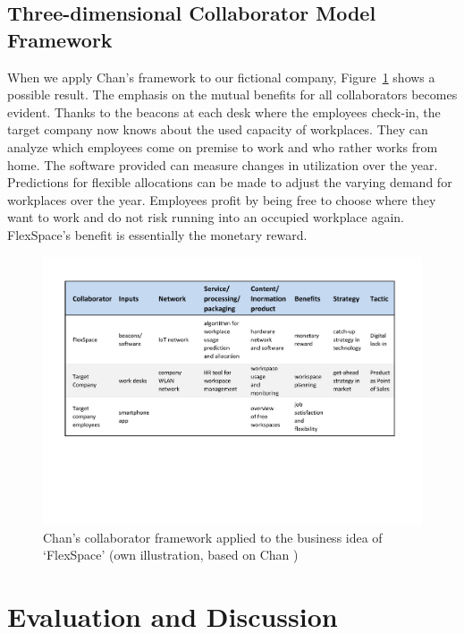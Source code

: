 	\subsection{Three-dimensional Collaborator Model Framework}
		When we apply Chan's framework to our fictional company, Figure~\ref{fig:use_case_chan} shows a possible result. The emphasis on the mutual benefits for all collaborators becomes evident. Thanks to the beacons at each desk where the employees check-in, the target company now knows about the used capacity of workplaces. They can analyze which employees come on premise to work and who rather works from home. The software provided can measure changes in utilization over the year. Predictions for flexible allocations can be made to adjust the varying demand for workplaces over the year. Employees profit by being free to choose where they want to work and do not risk running into an occupied workplace again. FlexSpace's benefit is essentially the monetary reward.

		\begin{figure}[ht]
		    \begin{center}
		    \includegraphics[scale=0.6]{Talk11/use_case_chan.pdf}
		    \end{center}
		    \caption{Chan's collaborator framework applied to the business idea of `FlexSpace' (own illustration, based on Chan \cite{chan})}
		    \label{fig:use_case_chan}
	    \end{figure}

\section{Evaluation and Discussion}
\label{sec:eval}

